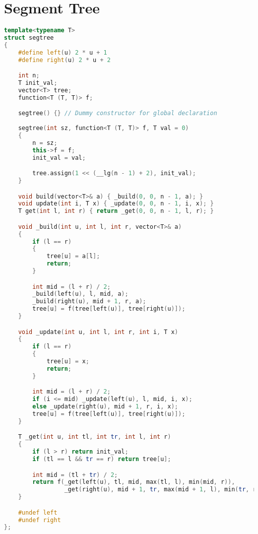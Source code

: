 \section{Segment Tree}
\begin{lstlisting}[language=C++]
template<typename T>
struct segtree
{
    #define left(u) 2 * u + 1
    #define right(u) 2 * u + 2

    int n;
    T init_val;
    vector<T> tree;
    function<T (T, T)> f;

    segtree() {} // Dummy constructor for global declaration
    
    segtree(int sz, function<T (T, T)> f, T val = 0)
    {
        n = sz;
        this->f = f;
        init_val = val;

        tree.assign(1 << (__lg(n - 1) + 2), init_val);
    }

    void build(vector<T>& a) { _build(0, 0, n - 1, a); }
    void update(int i, T x) { _update(0, 0, n - 1, i, x); }
    T get(int l, int r) { return _get(0, 0, n - 1, l, r); }

    void _build(int u, int l, int r, vector<T>& a)
    {
        if (l == r)
        {
            tree[u] = a[l];
            return;
        }

        int mid = (l + r) / 2;
        _build(left(u), l, mid, a);
        _build(right(u), mid + 1, r, a);
        tree[u] = f(tree[left(u)], tree[right(u)]);
    }

    void _update(int u, int l, int r, int i, T x)
    {
        if (l == r)
        {
            tree[u] = x;
            return;
        }

        int mid = (l + r) / 2;
        if (i <= mid) _update(left(u), l, mid, i, x);
        else _update(right(u), mid + 1, r, i, x);
        tree[u] = f(tree[left(u)], tree[right(u)]);
    }

    T _get(int u, int tl, int tr, int l, int r)
    {
        if (l > r) return init_val;
        if (tl == l && tr == r) return tree[u];

        int mid = (tl + tr) / 2;
        return f(_get(left(u), tl, mid, max(tl, l), min(mid, r)),
                 _get(right(u), mid + 1, tr, max(mid + 1, l), min(tr, r)));
    }

    #undef left
    #undef right
};
\end{lstlisting}
\sectionend

